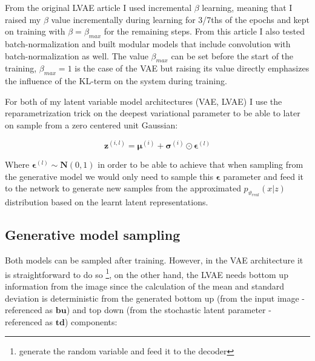 \documentclass[12pt, english]{article}
\begin{document}
\par From the original LVAE article \cite{sonderby2016ladder} I used incremental $\beta$ learning, meaning that I raised my $\beta$ value incrementally during learning for 3/7ths of the epochs and kept on training with $\beta = \beta_{max}$ for the remaining steps. From this article I also tested batch-normalization and built modular models that include convolution with batch-normalization as well. The value $\beta_{max}$ can be set before the start of the training, $\beta_{max} = 1$ is the case of the VAE but raising its value directly emphasizes the influence of the KL-term on the system during training.

\vspace{4mm}

\par For both of my latent variable model architectures (VAE, LVAE) I use the reparametrization trick on the deepest variational parameter to be able to later on sample from a zero centered unit Gaussian:

\vspace{4mm}

\begin{equation}
    \boldsymbol{\bm{z}}^{(i, l)} = \boldsymbol{\mu}^{(i)} + \boldsymbol{\sigma}^{(i)} \odot \boldsymbol{\bm{\epsilon}}^{(l)}
\end{equation}

\vspace{4mm}

\par Where $\boldsymbol{\bm{\epsilon}}^{(l)} \sim \boldsymbol{N}(0, 1)$ in order to be able to achieve that when sampling from the generative model we would only need to sample this $\bm{\epsilon}$ parameter and feed it to the network to generate new samples from the approximated $p_{\vartheta_{real}}(x | z)$ distribution based on the learnt latent representations.

\vspace{5mm}

\subsection{Generative model sampling}

\vspace{5mm}

\par Both models can be sampled after training. However, in the VAE architecture it is straightforward to do so \footnote{generate the random variable and feed it to the decoder}, on the other hand, the LVAE needs bottom up information from the image since the calculation of the mean and standard deviation is deterministic from the generated bottom up (from the input image - referenced as $\bm{bu}$) and top down (from the stochastic latent parameter - referenced as $\bm{td}$) components:
\end{document}
